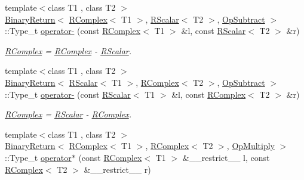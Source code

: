 \begin{DoxyCompactItemize}
{\footnotesize template$<$class T1 , class T2 $>$ }\\\mbox{\hyperlink{structENSEM_1_1BinaryReturn}{Binary\+Return}}$<$ \mbox{\hyperlink{classENSEM_1_1RComplex}{R\+Complex}}$<$ T1 $>$, \mbox{\hyperlink{classENSEM_1_1RScalar}{R\+Scalar}}$<$ T2 $>$, \mbox{\hyperlink{structENSEM_1_1OpSubtract}{Op\+Subtract}} $>$\+::Type\+\_\+t \mbox{\hyperlink{group__rcomplex_ga9ea00fde5e26657fc53ca42c40fa6618}{operator-\/}} (const \mbox{\hyperlink{classENSEM_1_1RComplex}{R\+Complex}}$<$ T1 $>$ \&l, const \mbox{\hyperlink{classENSEM_1_1RScalar}{R\+Scalar}}$<$ T2 $>$ \&r)
\begin{DoxyCompactList}\small\item\em \mbox{\hyperlink{classENSEM_1_1RComplex}{R\+Complex}} = \mbox{\hyperlink{classENSEM_1_1RComplex}{R\+Complex}} -\/ \mbox{\hyperlink{classENSEM_1_1RScalar}{R\+Scalar}}. \end{DoxyCompactList}\item 
{\footnotesize template$<$class T1 , class T2 $>$ }\\\mbox{\hyperlink{structENSEM_1_1BinaryReturn}{Binary\+Return}}$<$ \mbox{\hyperlink{classENSEM_1_1RScalar}{R\+Scalar}}$<$ T1 $>$, \mbox{\hyperlink{classENSEM_1_1RComplex}{R\+Complex}}$<$ T2 $>$, \mbox{\hyperlink{structENSEM_1_1OpSubtract}{Op\+Subtract}} $>$\+::Type\+\_\+t \mbox{\hyperlink{group__rcomplex_ga92f922f58ca43c5692f794ecb95dc1f5}{operator-\/}} (const \mbox{\hyperlink{classENSEM_1_1RScalar}{R\+Scalar}}$<$ T1 $>$ \&l, const \mbox{\hyperlink{classENSEM_1_1RComplex}{R\+Complex}}$<$ T2 $>$ \&r)
\begin{DoxyCompactList}\small\item\em \mbox{\hyperlink{classENSEM_1_1RComplex}{R\+Complex}} = \mbox{\hyperlink{classENSEM_1_1RScalar}{R\+Scalar}} -\/ \mbox{\hyperlink{classENSEM_1_1RComplex}{R\+Complex}}. \end{DoxyCompactList}\item 
{\footnotesize template$<$class T1 , class T2 $>$ }\\\mbox{\hyperlink{structENSEM_1_1BinaryReturn}{Binary\+Return}}$<$ \mbox{\hyperlink{classENSEM_1_1RComplex}{R\+Complex}}$<$ T1 $>$, \mbox{\hyperlink{classENSEM_1_1RComplex}{R\+Complex}}$<$ T2 $>$, \mbox{\hyperlink{structENSEM_1_1OpMultiply}{Op\+Multiply}} $>$\+::Type\+\_\+t \mbox{\hyperlink{group__rcomplex_gab6d38d52433e94dc9aedbb69f2463255}{operator$\ast$}} (const \mbox{\hyperlink{classENSEM_1_1RComplex}{R\+Complex}}$<$ T1 $>$ \&\+\_\+\+\_\+restrict\+\_\+\+\_\+ l, const \mbox{\hyperlink{classENSEM_1_1RComplex}{R\+Complex}}$<$ T2 $>$ \&\+\_\+\+\_\+restrict\+\_\+\+\_\+ r)

\end{DoxyCompactItemize}

